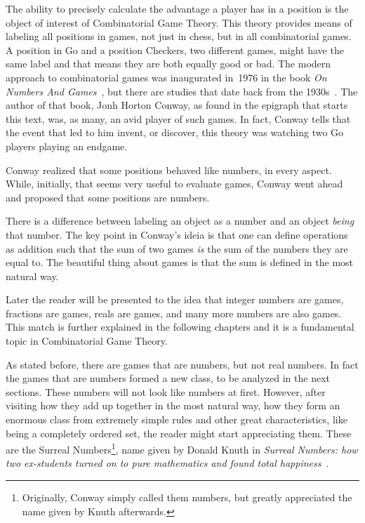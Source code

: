 The ability to precisely calculate the advantage a player has in a position is the object of interest of Combinatorial Game Theory. This theory provides means of labeling all positions in games, not just in chess, but in all combinatorial games. A position in Go and a position Checkers, two different games, might have the same label and that means they are both equally good or bad. The modern approach to combinatorial games was inaugurated in~1976 in the book \textit{On Numbers And Games}~\cite{ONAG1}, but there are studies that date back from the 1930s~\cite{CGT}. The author of that book, Jonh Horton Conway, as found in the epigraph that starts this text, was, as many, an avid player of such games. In fact, Conway tells that the event that led to him invent, or discover, this theory was watching two Go players playing an endgame.

Conway realized that some positions behaved like numbers, in every aspect. While, initially, that seems very useful to evaluate games, Conway went ahead and proposed that some positions are numbers.

There is a  difference between labeling an object as a number and an object \textit{being} that number. The key point in Conway's ideia is that one can define operations as addition such that the sum of two games \textit{is} the sum of the numbers they are equal to. The beautiful thing about games is that the sum is defined in the most natural way.

Later the reader will be presented to the  idea that integer numbers are games, fractions are games, reals are games, and many more numbers are also games. This match is further explained in the following chapters and it is a fundamental topic in Combinatorial Game Theory.

As stated before, there are games that are numbers, but not real numbers. In fact the games that are numbers formed a new class, to be analyzed in the next sections. These numbers will not look like numbers at first. However, after visiting how they add up together in the most natural way, how they form an enormous class from extremely simple rules and other great characteristics, like being a completely ordered set, the reader might start appreciating them. These are the Surreal Numbers\footnote{Originally, Conway simply called them numbers, but greatly appreciated the name given by Knuth afterwards.}, name given by Donald Knuth in \textit{Surreal Numbers: how two ex-students turned on to pure mathematics and found total happiness}~\cite{SN}.


